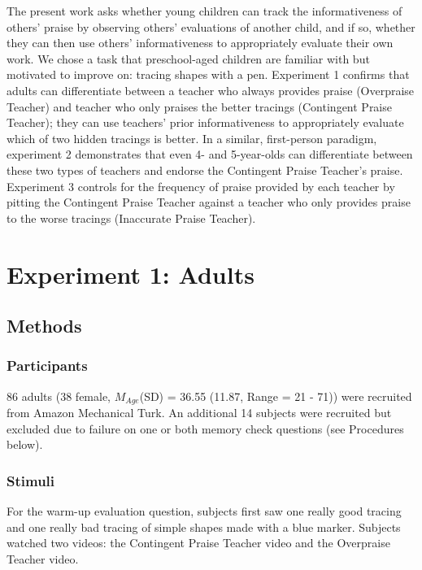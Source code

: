 \documentclass[10pt, letterpaper]{article}
\begin{document}
The present work asks whether young children can track the
informativeness of others' praise by observing others' evaluations of
another child, and if so, whether they can then use others'
informativeness to appropriately evaluate their own work. We chose a
task that preschool-aged children are familiar with but motivated to
improve on: tracing shapes with a pen. Experiment 1 confirms that adults
can differentiate between a teacher who always provides praise
(Overpraise Teacher) and teacher who only praises the better tracings
(Contingent Praise Teacher); they can use teachers' prior
informativeness to appropriately evaluate which of two hidden tracings
is better. In a similar, first-person paradigm, experiment 2
demonstrates that even 4- and 5-year-olds can differentiate between
these two types of teachers and endorse the Contingent Praise Teacher's
praise. Experiment 3 controls for the frequency of praise provided by
each teacher by pitting the Contingent Praise Teacher against a teacher
who only provides praise to the worse tracings (Inaccurate Praise
Teacher).

\section{Experiment 1: Adults}\label{experiment-1-adults}

\subsection{Methods}\label{methods}

\subsubsection{Participants}\label{participants}

86 adults (38 female, \(M_{Age}\)(SD) = 36.55 (11.87, Range = 21 - 71))
were recruited from Amazon Mechanical Turk. An additional 14 subjects
were recruited but excluded due to failure on one or both memory check
questions (see Procedures below).

\subsubsection{Stimuli}\label{stimuli}

For the warm-up evaluation question, subjects first saw one really good
tracing and one really bad tracing of simple shapes made with a blue
marker. Subjects watched two videos: the Contingent Praise Teacher video
and the Overpraise Teacher video.
\end{document}
